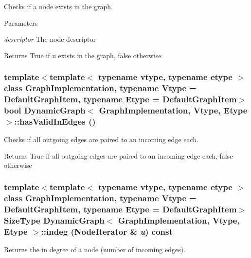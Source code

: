 Checks if a node exists in the graph. 


\begin{DoxyParams}{Parameters}
\item[{\em descriptor}]The node descriptor \end{DoxyParams}
\begin{DoxyReturn}{Returns}
True if u exists in the graph, false otherwise 
\end{DoxyReturn}
\hypertarget{class_dynamic_graph_af9c2a597b80be5d539b085eb926ffec9}{
\subsubsection[{hasValidInEdges}]{\setlength{\rightskip}{0pt plus 5cm}template$<$template$<$ typename vtype, typename etype $>$ class GraphImplementation, typename Vtype  = DefaultGraphItem, typename Etype  = DefaultGraphItem$>$ bool {\bf DynamicGraph}$<$ GraphImplementation, Vtype, Etype $>$::hasValidInEdges ()}}
\label{class_dynamic_graph_af9c2a597b80be5d539b085eb926ffec9}


Checks if all outgoing edges are paired to an incoming edge each. 

\begin{DoxyReturn}{Returns}
True if all outgoing edges are paired to an incoming edge each, false otherwise 
\end{DoxyReturn}
\hypertarget{class_dynamic_graph_adf611f51b16f0fd3d2569c97ce966ff8}{
\subsubsection[{indeg}]{\setlength{\rightskip}{0pt plus 5cm}template$<$template$<$ typename vtype, typename etype $>$ class GraphImplementation, typename Vtype  = DefaultGraphItem, typename Etype  = DefaultGraphItem$>$ SizeType {\bf DynamicGraph}$<$ GraphImplementation, Vtype, Etype $>$::indeg (NodeIterator \& {\em u}) const}}
\label{class_dynamic_graph_adf611f51b16f0fd3d2569c97ce966ff8}


Returns the in degree of a node (number of incoming edges). 


